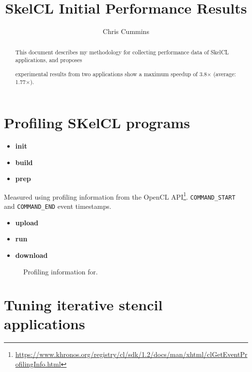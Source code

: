 
\title{SkelCL Initial Performance Results}

\author{Chris Cummins}





\maketitle

\begin{abstract}
  \noindent
  This document describes my methodology for collecting performance
  data of SkelCL applications, and proposes

  experimental results from two applications show a maximum speedup of
  3.8$\times$ (average: 1.77$\times$).
\end{abstract}

\section{Profiling SKelCL programs}

\begin{itemize}
\item \textbf{init}
\item \textbf{build}
\item \textbf{prep}
\end{itemize}

Measured using profiling information from the OpenCL
API\footnote{\url{https://www.khronos.org/registry/cl/sdk/1.2/docs/man/xhtml/clGetEventProfilingInfo.html}}. \texttt{COMMAND\_START}
and \texttt{COMMAND\_END} event timestamps.

\begin{itemize}
\item \textbf{upload}
\item \textbf{run}
\item \textbf{download}
\end{itemize}

\begin{figure}
\centering

\caption{%
Profiling information for.%
}
\label{fig:events}
\end{figure}

\section{Tuning iterative stencil applications}

